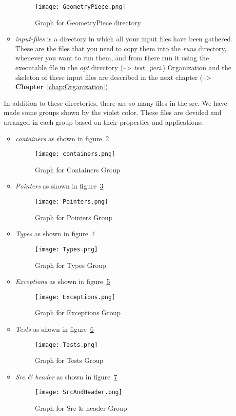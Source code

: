 \documentclass[11pt,fleqn]{book} %
\begin{document}
\begin{itemize}
\begin{itemize}
\begin{figure}
  \texttt{[image: GeometryPiece.png]}
  \caption{Graph for GeometryPiece directory}
  \label{fig:GeometryPiece}
\end{figure}
 \item \emph{input-files} is a directory in which all your input files have been gathered. These are the files that you need to copy them into the \emph{runs} directory, whenever you want to run them, and from there run it using the executable file in the \emph{opt} directory (--> \emph{test\_peri}.) Organization and the skeleton of these input files are described in the next chapter (--> \textbf{Chapter}~\ref{chap:Organization})
 \end{itemize}
In addition to these directories, there are so many files in the src. We have made some groups shown by the violet color. These files are devided and arranged in each group based on their properties and applications:
\begin{itemize}
 \item \emph{containers} as shown in figure~\ref{fig:containers}
\begin{figure}
  \texttt{[image: containers.png]}
  \caption{Graph for Containers Group}
  \label{fig:containers}
\end{figure}
 \item \emph{Pointers} as shown in figure~\ref{fig:Pointers}
\begin{figure}
  \texttt{[image: Pointers.png]}
  \caption{Graph for Pointers Group}
  \label{fig:Pointers}
\end{figure}
 \item \emph{Types} as shown in figure~\ref{fig:Types}
\begin{figure}
  \texttt{[image: Types.png]}
  \caption{Graph for Types Group}
  \label{fig:Types}
\end{figure}
 \item \emph{Exceptions} as shown in figure~\ref{fig:Exceptions}
\begin{figure}
  \texttt{[image: Exceptions.png]}
  \caption{Graph for Exceptions Group}
  \label{fig:Exceptions}
\end{figure}
 \item \emph{Tests} as shown in figure~\ref{fig:Tests}
\begin{figure}
  \texttt{[image: Tests.png]}
  \caption{Graph for Tests Group}
  \label{fig:Tests}
\end{figure}
 \item \emph{Src \& header} as shown in figure~\ref{fig:SrcAndHeader}
\begin{figure}
  \texttt{[image: SrcAndHeader.png]}
  \caption{Graph for Src \& header Group}
  \label{fig:SrcAndHeader}
\end{figure}
 \end{itemize}
\end{itemize}
\end{document}
